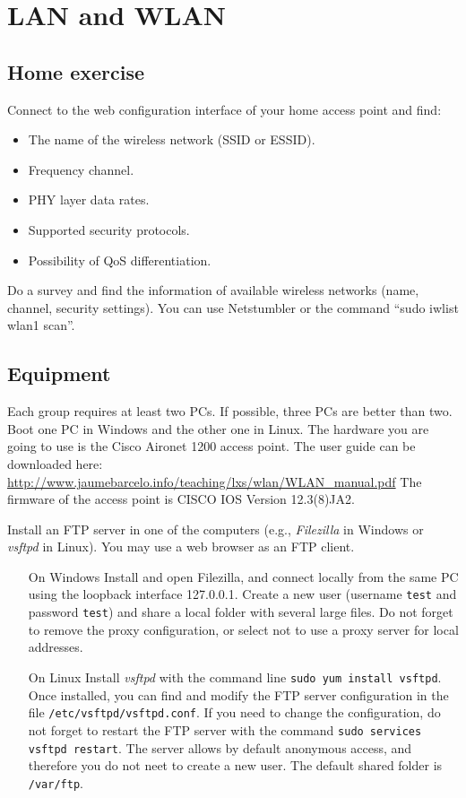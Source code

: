\chapter{LAN and WLAN}

\section{Home exercise}

Connect to the web configuration interface of your home access point and find:
\begin{itemize}
\item The name of the wireless network (SSID or ESSID).
\item Frequency channel.
\item PHY layer data rates.
\item Supported security protocols.
\item Possibility of QoS differentiation.
\end{itemize}

Do a survey and find the information of available wireless networks (name, channel, security settings).
You can use Netstumbler or the command ``sudo iwlist wlan1 scan''.

\section{Equipment}

Each group requires at least two PCs.
If possible, three PCs are better than two.
Boot one PC in Windows and the other one in Linux.
The hardware you are going to use is the Cisco Aironet 1200 access point.
The user guide can be downloaded here: \ifpdf \url{http://www.jaumebarcelo.info/teaching/lxs/wlan/WLAN_manual.pdf} \fi
The firmware of the access point is CISCO IOS Version 12.3(8)JA2.

Install an FTP server in one of the computers (e.g., \emph{Filezilla} in Windows or \emph{vsftpd} in Linux). You may use a web browser as an FTP client.

\begin{itemize}

\item[On Windows] Install and open Filezilla, and connect locally from the same PC using the loopback interface 127.0.0.1. Create a new user (username \texttt{test} and password \texttt{test}) and share a local folder with several large files. Do not forget to remove the proxy configuration, or select not to use a proxy server for local addresses.
    
\item[On Linux] Install \emph{vsftpd} with the command line \texttt{sudo yum install vsftpd}. Once installed, you can find and modify the FTP server configuration in the file \texttt{/etc/vsftpd/vsftpd.conf}. If you need to change the configuration, do not forget to restart the FTP server with the command \texttt{sudo services vsftpd restart}. The server allows by default anonymous access, and therefore you do not neet to create a new user. The default shared folder is \texttt{/var/ftp}.

\end{itemize}

